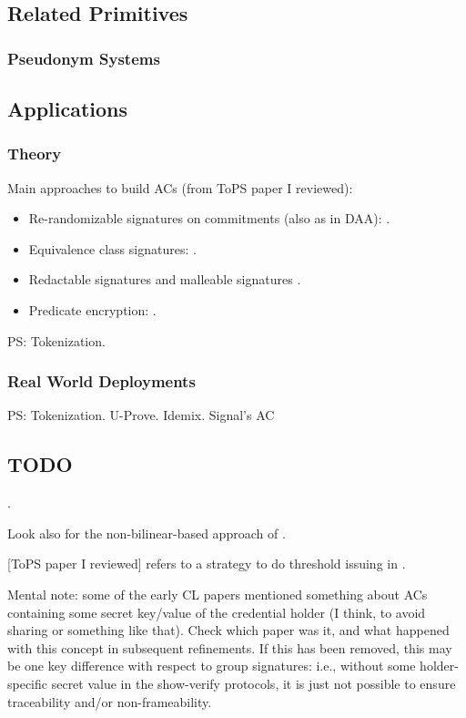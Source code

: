 \subsection{Related Primitives}

\subsubsection{Pseudonym Systems}
\label{sssec:pseudonyms}


\subsection{Applications}
\label{ssec:acapplication}

\subsubsection{Theory}
\label{sssec:actheoryapp}

Main approaches to build ACs (from ToPS paper I reviewed):

\begin{itemize}
\item Re-randomizable signatures on commitments (also as in DAA):
  \cite{cl02,cl04,lmpy16,ps16}.
\item Equivalence class signatures: \cite{fhs19,hs14}.
\item Redactable signatures \cite{cdhk15,sand20} and malleable signatures
  \cite{ckl14}.
\item Predicate encryption: \cite{dmm+18}.
\end{itemize}

PS: Tokenization.

\subsubsection{Real World Deployments}
\label{sssec:acrwdeploy}

PS: Tokenization.
U-Prove.
Idemix.
Signal's AC \cite{}

\subsection{TODO}

\cite{cl04,ckl+15}.

Look also for the non-bilinear-based approach of \cite{cl04}.

[ToPS paper I reviewed] refers to a strategy to do threshold issuing in \cite{bbh06}.

Mental note: some of the early CL papers mentioned something about ACs
containing some secret key/value of the credential holder (I think, to avoid
sharing or something like that). Check which paper was it, and what happened
with this concept in subsequent refinements. If this has been removed, this may
be one key difference with respect to group signatures: i.e., without some
holder-specific secret value in the show-verify protocols, it is just not
possible to ensure traceability and/or non-frameability.

